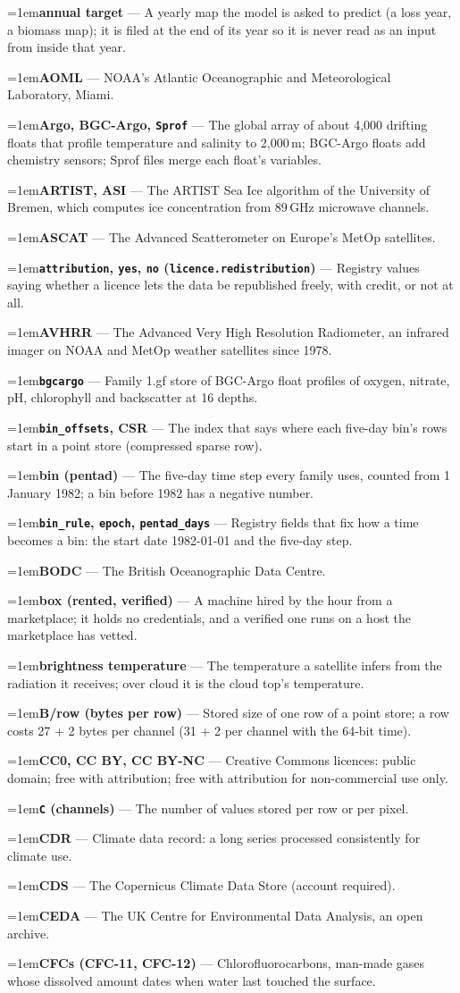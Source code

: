 \documentclass[10pt]{article}
\newcommand{\code}[1]{\texttt{#1}}
\newcommand{\gl}[2]{\par\hangindent=1em\hangafter=1\textbf{#1} --- #2\par}
\begin{document}
\gl{annual target}{A yearly map the model is asked to predict (a loss year, a biomass map); it is filed at the end of its year so it is never read as an input from inside that year.}
\gl{AOML}{NOAA's Atlantic Oceanographic and Meteorological Laboratory, Miami.}
\gl{Argo, BGC-Argo, \code{Sprof}}{The global array of about 4,000 drifting floats that profile temperature and salinity to 2,000\,m; BGC-Argo floats add chemistry sensors; Sprof files merge each float's variables.}
\gl{ARTIST, ASI}{The ARTIST Sea Ice algorithm of the University of Bremen, which computes ice concentration from 89\,GHz microwave channels.}
\gl{ASCAT}{The Advanced Scatterometer on Europe's MetOp satellites.}
\gl{\code{attribution}, \code{yes}, \code{no} (\code{licence.redistribution})}{Registry values saying whether a licence lets the data be republished freely, with credit, or not at all.}
\gl{AVHRR}{The Advanced Very High Resolution Radiometer, an infrared imager on NOAA and MetOp weather satellites since 1978.}
\gl{\code{bgcargo}}{Family 1.gf store of BGC-Argo float profiles of oxygen, nitrate, pH, chlorophyll and backscatter at 16 depths.}
\gl{\code{bin\_offsets}, CSR}{The index that says where each five-day bin's rows start in a point store (compressed sparse row).}
\gl{bin (pentad)}{The five-day time step every family uses, counted from 1 January 1982; a bin before 1982 has a negative number.}
\gl{\code{bin\_rule}, \code{epoch}, \code{pentad\_days}}{Registry fields that fix how a time becomes a bin: the start date 1982-01-01 and the five-day step.}
\gl{BODC}{The British Oceanographic Data Centre.}
\gl{box (rented, verified)}{A machine hired by the hour from a marketplace; it holds no credentials, and a verified one runs on a host the marketplace has vetted.}
\gl{brightness temperature}{The temperature a satellite infers from the radiation it receives; over cloud it is the cloud top's temperature.}
\gl{B/row (bytes per row)}{Stored size of one row of a point store; a row costs 27 + 2 bytes per channel (31 + 2 per channel with the 64-bit time).}
\gl{CC0, CC BY, CC BY-NC}{Creative Commons licences: public domain; free with attribution; free with attribution for non-commercial use only.}
\gl{\code{C} (channels)}{The number of values stored per row or per pixel.}
\gl{CDR}{Climate data record: a long series processed consistently for climate use.}
\gl{CDS}{The Copernicus Climate Data Store (account required).}
\gl{CEDA}{The UK Centre for Environmental Data Analysis, an open archive.}
\gl{CFCs (CFC-11, CFC-12)}{Chlorofluorocarbons, man-made gases whose dissolved amount dates when water last touched the surface.}
\end{document}
